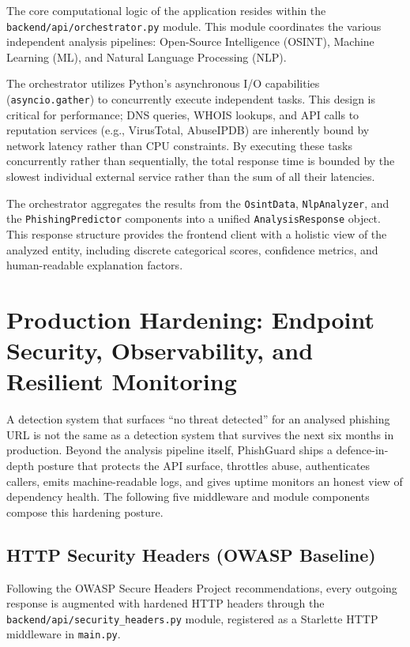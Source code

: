 The core computational logic of the application resides within the
\texttt{backend/api/orchestrator.py} module. This module coordinates the
various independent analysis pipelines: Open-Source Intelligence
(OSINT), Machine Learning (ML), and Natural Language Processing (NLP).

The orchestrator utilizes Python's asynchronous I/O capabilities
(\texttt{asyncio.gather}) to concurrently execute independent tasks.
This design is critical for performance; DNS queries, WHOIS lookups, and
API calls to reputation services (e.g., VirusTotal, AbuseIPDB) are
inherently bound by network latency rather than CPU constraints. By
executing these tasks concurrently rather than sequentially, the total
response time is bounded by the slowest individual external service
rather than the sum of all their latencies.

The orchestrator aggregates the results from the \texttt{OsintData},
\texttt{NlpAnalyzer}, and the \texttt{PhishingPredictor} components into
a unified \texttt{AnalysisResponse} object. This response structure
provides the frontend client with a holistic view of the analyzed
entity, including discrete categorical scores, confidence metrics, and
human-readable explanation factors.


\section{Production Hardening: Endpoint Security, Observability, and Resilient Monitoring}\label{production-hardening}

A detection system that surfaces ``no threat detected'' for an analysed phishing URL is not the same as a detection system that survives the next six months in production. Beyond the analysis pipeline itself, PhishGuard ships a defence-in-depth posture that protects the API surface, throttles abuse, authenticates callers, emits machine-readable logs, and gives uptime monitors an honest view of dependency health. The following five middleware and module components compose this hardening posture.

\subsection{HTTP Security Headers (OWASP Baseline)}

Following the OWASP Secure Headers Project recommendations, every outgoing response is augmented with hardened HTTP headers through the \texttt{backend/api/security\_headers.py} module, registered as a Starlette HTTP middleware in \texttt{main.py}.

